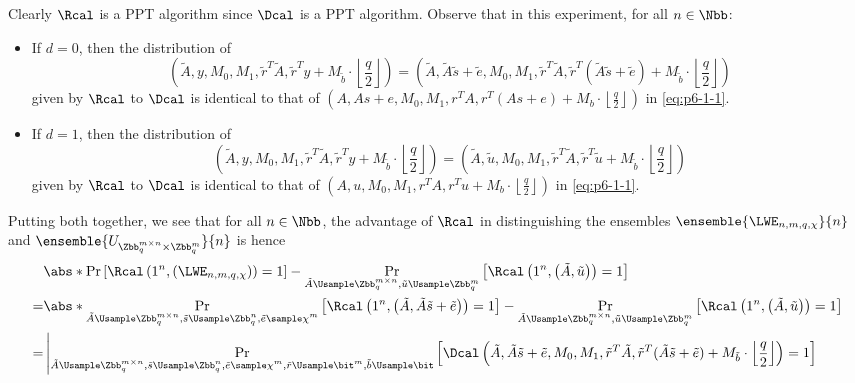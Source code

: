 \begin{answer}[i]
    Clearly $\Rcal$ is a PPT algorithm since $\Dcal$ is a PPT algorithm. Observe that in this experiment, for all $n\in\Nbb$:
    \begin{itemize}
        \item If $d=0$, then the distribution of 
        \[
            \left(\tilde{A}, y, M_0, M_1, \tilde{r}^T\tilde{A}, \tilde{r}^Ty+M_{\tilde{b}} \cdot \left\lfloor\frac{q}{2}\right\rfloor\right)
            =\left(\tilde{A}, \tilde{A}\tilde{s}+\tilde{e}, M_0, M_1, \tilde{r}^T\tilde{A}, \tilde{r}^T (\tilde{A}\tilde{s}+\tilde{e})+M_{\tilde{b}} \cdot \left\lfloor\frac{q}{2}\right\rfloor\right)
        \] 
        given by $\Rcal$ to $\Dcal$ is identical to that of $\left(A, As+e, M_0, M_1, r^TA, r^T(As+e) +M_b \cdot \left\lfloor\frac{q}{2}\right\rfloor\right)$ in \eqref{eq:p6-1-1}.
        \item If $d=1$, then the distribution of 
        \[
            \left(\tilde{A}, y, M_0, M_1, \tilde{r}^T\tilde{A}, \tilde{r}^Ty+M_{\tilde{b}} \cdot \left\lfloor\frac{q}{2}\right\rfloor\right)
            =\left(\tilde{A}, \tilde{u}, M_0, M_1, \tilde{r}^T\tilde{A}, \tilde{r}^T \tilde{u}+M_{\tilde{b}} \cdot \left\lfloor\frac{q}{2}\right\rfloor\right)
        \] 
        given by $\Rcal$ to $\Dcal$ is identical to that of $\left(A, u, M_0, M_1, r^TA, r^Tu +M_b \cdot \left\lfloor\frac{q}{2}\right\rfloor\right)$ in \eqref{eq:p6-1-1}.
    \end{itemize}
    Putting both together, we see that for all $n\in\Nbb$, the advantage of $\Rcal$ in distinguishing the ensembles $\ensemble{\LWE_{n,m,q,\chi}}{n}$ and $\ensemble{U_{\Zbb_q^{m\times n}\times \Zbb_q^m}}{n}$ is hence
    \begin{align*}
        &\abs*{\Pr\left[\Rcal\left(1^n,\left(\LWE_{n,m,q,\chi}\right)\right)= 1\right] 
        -
        \Pr_{\tilde{A}\Usample\Zbb_q^{m\times n},\tilde{u}\Usample\Zbb_q^m}\left[\Rcal\left(1^n,\left(\tilde{A}, \tilde{u}\right)\right)= 1\right]}\\
        =&\abs*{\Pr_{\substack{\tilde{A}\Usample\Zbb_q^{m\times n},\tilde{s}\Usample\Zbb_q^n, \tilde{e}\sample\chi^m}}\left[\Rcal\left(1^n,\left(\tilde{A}, \tilde{A}\tilde{s}+\tilde{e}\right)\right)= 1\right] 
        -
        \Pr_{\tilde{A}\Usample\Zbb_q^{m\times n},\tilde{u}\Usample\Zbb_q^m}\left[\Rcal\left(1^n,\left(\tilde{A}, \tilde{u}\right)\right)= 1\right]}\\
        =& \left\lvert\Pr_{\substack{\tilde{A}\Usample\Zbb_q^{m\times n},\tilde{s}\Usample\Zbb_q^n, \tilde{e}\sample\chi^m, \tilde{r}\Usample\bit^m, \tilde{b}\Usample\bit}}\left[\Dcal\left(\tilde{A}, \tilde{A}\tilde{s}+\tilde{e}, M_0, M_1, \tilde{r}^T\tilde{A}, \tilde{r}^T (\tilde{A}\tilde{s}+\tilde{e})+M_{\tilde{b}} \cdot \left\lfloor\frac{q}{2}\right\rfloor\right)= 1\right] \right.\\

\end{align*}
\end{answer}
